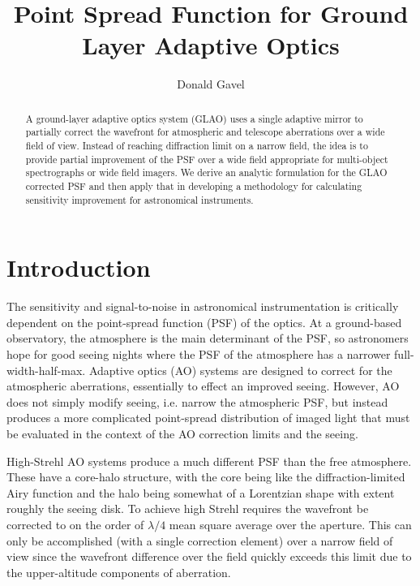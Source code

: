 \documentclass[11pt, oneside]{article}   	%
\title{Point Spread Function for Ground Layer Adaptive Optics}
\author{Donald Gavel}
\date{}							%
\begin{document}
\maketitle

\begin{abstract}
A ground-layer adaptive optics system (GLAO) uses a single adaptive mirror to partially correct the wavefront for atmospheric and telescope aberrations over a wide field of view. Instead of reaching diffraction limit on a narrow field, the idea is to provide partial improvement of the PSF over a wide field appropriate for multi-object spectrographs or wide field imagers. We derive an analytic formulation for the GLAO corrected PSF and then apply that in developing a methodology for calculating sensitivity improvement for astronomical instruments.
\end{abstract}

\section{Introduction}

The sensitivity and signal-to-noise in astronomical instrumentation is critically dependent on the point-spread function (PSF) of the optics. At a ground-based observatory, the atmosphere is the main determinant of the PSF, so astronomers hope for good seeing nights where the PSF of the atmosphere has a narrower full-width-half-max. Adaptive optics (AO) systems are designed to correct for the atmospheric aberrations, essentially to effect an improved seeing. However, AO does not simply modify seeing, i.e. narrow the atmospheric PSF, but instead produces a more complicated point-spread distribution of imaged light that must be evaluated in the context of the AO correction limits and the seeing.

High-Strehl AO systems produce a much different PSF than the free atmosphere. These have a core-halo structure, with the core being like the diffraction-limited Airy function and the halo being somewhat of a Lorentzian shape with extent roughly the seeing disk. To achieve high Strehl requires the wavefront be corrected to  on the order of $\lambda / 4$ mean square average over the aperture. This can only be accomplished (with a single correction element) over a narrow field of view since the wavefront difference over the field quickly exceeds this limit due to the upper-altitude components of aberration.
\end{document}
